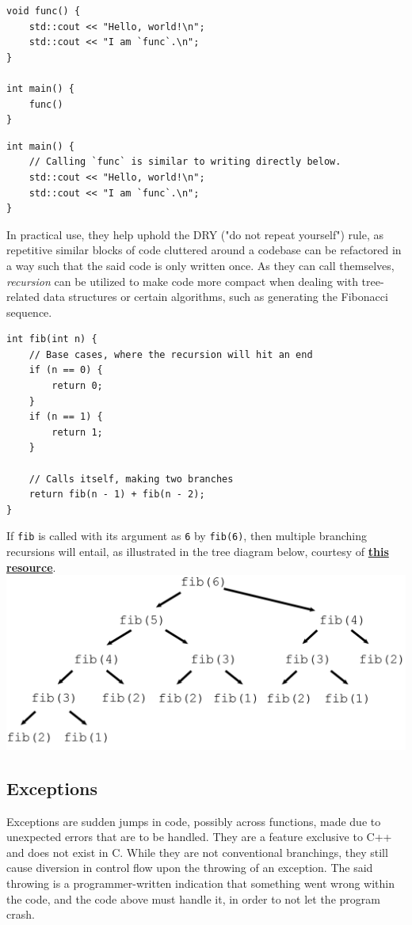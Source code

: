 \documentclass[12pt]{article}
\begin{document}
\begin{verbatim}
void func() {
    std::cout << "Hello, world!\n";
    std::cout << "I am `func`.\n";
}

int main() {
    func()
}
\end{verbatim}

\begin{verbatim}
int main() {
    // Calling `func` is similar to writing directly below.
    std::cout << "Hello, world!\n";
    std::cout << "I am `func`.\n";
}
\end{verbatim}

In practical use, they help uphold the DRY ("do not repeat yourself") rule, as repetitive similar blocks of code cluttered around a codebase can be refactored in a way such that the said code is only written once. As they can call themselves, \textit{recursion} can be utilized to make code more compact when dealing with tree-related data structures or certain algorithms, such as generating the Fibonacci sequence.

\begin{verbatim}
int fib(int n) {
    // Base cases, where the recursion will hit an end
    if (n == 0) {
        return 0;
    }
    if (n == 1) {
        return 1;
    }

    // Calls itself, making two branches
    return fib(n - 1) + fib(n - 2);
}
\end{verbatim}

\pagebreak
If \texttt{fib} is called with its argument as \texttt{6} by \texttt{fib(6)}, then multiple branching recursions will entail, as illustrated in the tree diagram below, courtesy of \href{https://willrosenbaum.com/assets/img/recursive-fibonacci/tree.png}{\textbf{this resource}}.
\newline\includegraphics[width=\textwidth]{fibonacci}

\subsection{Exceptions}
Exceptions are sudden jumps in code, possibly across functions, made due to unexpected errors that are to be handled. They are a feature exclusive to C++ and does not exist in C. While they are not conventional branchings, they still cause diversion in control flow upon the throwing of an exception. The said throwing is a programmer-written indication that something went wrong within the code, and the code above must handle it, in order to not let the program crash.
\end{document}
